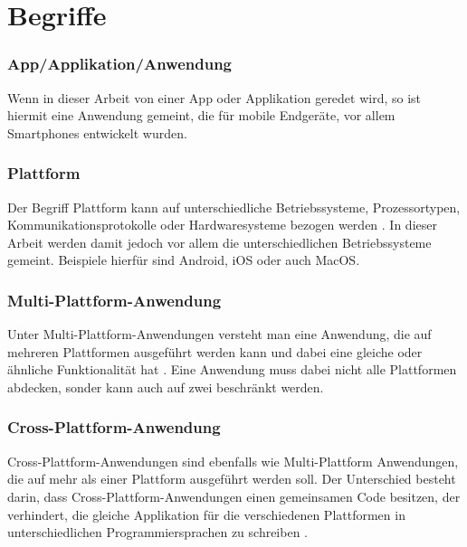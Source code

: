 \section{Begriffe}
\subsubsection{App/Applikation/Anwendung}
Wenn in dieser Arbeit von einer App oder Applikation geredet wird, so ist hiermit eine Anwendung gemeint, die für mobile Endgeräte, vor allem Smartphones entwickelt wurden.
\subsubsection{Plattform}
Der Begriff Plattform kann auf unterschiedliche Betriebssysteme, Prozessortypen, Kommunikationsprotokolle oder Hardwaresysteme bezogen werden \cite{2014Mulit_plattform_definition}. In dieser Arbeit werden damit jedoch vor allem die unterschiedlichen Betriebssysteme gemeint. Beispiele hierfür sind Android, iOS oder auch MacOS. 
\subsubsection{Multi-Plattform-Anwendung}
Unter Multi-Plattform-Anwendungen versteht man eine Anwendung, die auf mehreren Plattformen ausgeführt werden kann und dabei eine gleiche oder ähnliche Funktionalität hat \cite{2014Mulit_plattform_definition}. Eine Anwendung muss dabei nicht alle Plattformen abdecken, sonder kann auch auf zwei beschränkt werden.
\subsubsection{Cross-Plattform-Anwendung}
Cross-Plattform-Anwendungen sind ebenfalls wie Multi-Plattform Anwendungen, die auf mehr als einer Plattform ausgeführt werden soll. Der Unterschied besteht darin, dass Cross-Plattform-Anwendungen einen gemeinsamen Code besitzen, der verhindert, die gleiche Applikation für die verschiedenen Plattformen in unterschiedlichen Programmiersprachen zu schreiben \cite{2014_Cross-plattform}.